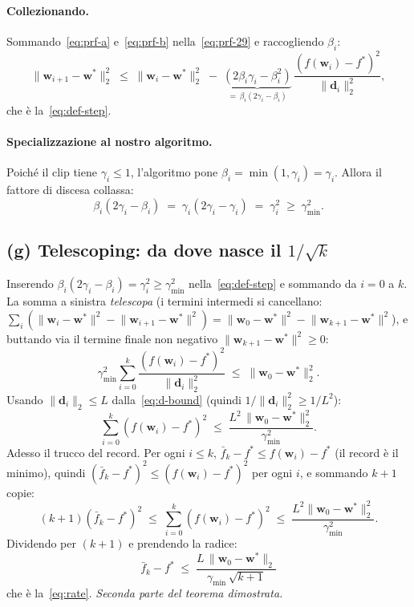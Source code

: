 \documentclass[11pt,a4paper]{article}
\theoremstyle{definition}
\newcommand{\w}{\bm{w}}
\newcommand{\dvec}{\bm{d}}
\newcommand{\wstar}{\w^{*}}
\newcommand{\fstar}{f^{*}}
\newcommand{\fbar}{\bar{f}}
\newcommand{\gmin}{\gamma_{\min}}
\newcommand{\norm}[1]{\lVert #1\rVert}
\begin{document}
\paragraph{Collezionando.} Sommando~\eqref{eq:prf-a} e~\eqref{eq:prf-b}
nella~\eqref{eq:prf-29} e raccogliendo $\beta_i$:
\[
\norm{\w_{i+1}-\wstar}_2^2 \;\le\; \norm{\w_i-\wstar}_2^2 \;-\;\underbrace{(2\beta_i\gamma_i-\beta_i^2)}_{=\,\beta_i(2\gamma_i-\beta_i)}\,\frac{(f(\w_i)-\fstar)^2}{\norm{\dvec_i}_2^2},
\]
che è la~\eqref{eq:def-step}. \checkmark

\paragraph{Specializzazione al nostro algoritmo.} Poiché il clip tiene $\gamma_i\le1$,
l'algoritmo pone $\beta_i=\min(1,\gamma_i)=\gamma_i$. Allora il fattore di discesa collassa:
\begin{equation}\label{eq:fattore-gamma2}
\beta_i(2\gamma_i-\beta_i) \;=\; \gamma_i(2\gamma_i-\gamma_i) \;=\; \gamma_i^2 \;\ge\; \gmin^2 .
\end{equation}

\subsection{(g) Telescoping: da dove nasce il $1/\sqrt{k}$}
\label{sub:telescoping}

Inserendo $\beta_i(2\gamma_i-\beta_i)=\gamma_i^2\ge\gmin^2$ nella~\eqref{eq:def-step} e
sommando da $i=0$ a $k$. La somma a sinistra \emph{telescopa} (i termini intermedi si
cancellano: $\sum_i(\norm{\w_i-\wstar}^2-\norm{\w_{i+1}-\wstar}^2)=\norm{\w_0-\wstar}^2-\norm{\w_{k+1}-\wstar}^2$),
e buttando via il termine finale non negativo $\norm{\w_{k+1}-\wstar}^2\ge0$:
\[
\gmin^2\sum_{i=0}^k \frac{(f(\w_i)-\fstar)^2}{\norm{\dvec_i}_2^2} \;\le\; \norm{\w_0-\wstar}_2^2 .
\]
Usando $\norm{\dvec_i}_2\le L$ dalla~\eqref{eq:d-bound} (quindi
$1/\norm{\dvec_i}_2^2\ge1/L^2$):
\[
\sum_{i=0}^k (f(\w_i)-\fstar)^2 \;\le\; \frac{L^2\,\norm{\w_0-\wstar}_2^2}{\gmin^2}.
\]
Adesso il trucco del record. Per ogni $i\le k$, $\fbar_k-\fstar\le f(\w_i)-\fstar$ (il record
è il minimo), quindi $(\fbar_k-\fstar)^2\le(f(\w_i)-\fstar)^2$ per ogni $i$, e sommando
$k+1$ copie:
\[
(k+1)(\fbar_k-\fstar)^2 \;\le\; \sum_{i=0}^k (f(\w_i)-\fstar)^2 \;\le\; \frac{L^2\norm{\w_0-\wstar}_2^2}{\gmin^2}.
\]
Dividendo per $(k+1)$ e prendendo la radice:
\[
\boxed{\;\fbar_k-\fstar \;\le\; \frac{L\,\norm{\w_0-\wstar}_2}{\gmin\,\sqrt{k+1}}\;}
\]
che è la~\eqref{eq:rate}. \emph{Seconda parte del teorema dimostrata.}
\end{document}
